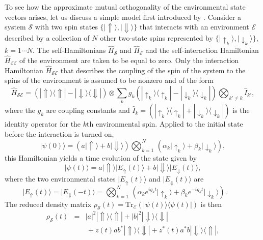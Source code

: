 \documentclass[rmp,aps,amsmath,amsfonts,noshowkeys,noshowpacs,12pt]{revtex4}
\newcommand{\ket}[1]{\ensuremath{|{#1\rangle}}}
\newcommand{\bra}[1]{\ensuremath{{\langle #1}|}}
\newcommand{\ketbra}[2]{\ensuremath{|{#1 \rangle}{\langle #2}|}}
\begin{document}
To see how the approximate mutual orthogonality of the environmental
state vectors arises, let us discuss a simple model first introduced
by \citet{Zurek:1982:tv}.  Consider a system $\mathcal{S}$ with two
spin states $\{ \ket{\Uparrow}, \ket{\Downarrow} \}$ that interacts
with an environment $\mathcal{E}$ described by a collection of $N$
other two-state spins represented by $\{ \ket{\uparrow_k},
\ket{\downarrow_k} \}$, $k=1\cdots N$. The self-Hamiltonians
$\widehat{H}_{\mathcal{S}}$ and $\widehat{H}_{\mathcal{E}}$ and the
self-interaction Hamiltonian $\widehat{H}_\mathcal{EE}$ of the
environment are taken to be equal to zero.  Only the interaction
Hamiltonian $\widehat{H}_\mathcal{SE}$ that describes the coupling of
the spin of the system to the spins of the environment is assumed to
be nonzero and of the form
%
\begin{equation} 
\widehat{H}_\mathcal{SE} = ( \ketbra{\Uparrow}{\Uparrow} -
\ketbra{\Downarrow}{\Downarrow} ) \otimes \sum_k g_k (
\ketbra{\uparrow_k}{\uparrow_k} - \ketbra{\downarrow_k}{\downarrow_k} )
\bigotimes_{k' \not= k}  \widehat{I}_{k'}, 
\end{equation}
%
where the $g_k$ are coupling constants and $\widehat{I}_{k} =
(\ketbra{\uparrow_k}{\uparrow_k} +
\ketbra{\downarrow_k}{\downarrow_k})$ is the identity operator for the
$k$th environmental spin. Applied to the initial state before the
interaction is turned on,
%
\begin{equation}
\ket{\psi(0)} = ( a\ket{\Uparrow} + b\ket{\Downarrow} ) \bigotimes_{k=1}^N
\, ( \alpha_k \ket{\uparrow_k} + \beta_k \ket{\downarrow_k} ),
\end{equation}
%
this Hamiltonian yields a time evolution of the state given by
%
\begin{equation} 
\ket{\psi(t)} = a\ket{\Uparrow}\ket{E_{\Uparrow}(t)} +
b\ket{\Downarrow}\ket{E_{\Downarrow}(t)},
\end{equation}
%
where the two environmental states $\ket{E_{\Uparrow}(t)}$ and
$\ket{E_{\Downarrow}(t)}$ are
%
\begin{equation} 
\ket{E_{\Uparrow}(t)} = \ket{E_{\Downarrow}(-t)} 
= \bigotimes_{k=1}^N\,
 ( \alpha_k e^{ig_kt}\ket{\uparrow_k} + \beta_k
e^{-ig_kt}\ket{\downarrow_k} ). \phantom{xxxx} 
\end{equation}
%
The reduced density matrix $\rho_{\mathcal{S}}(t)=\text{Tr}_{\mathcal{E}} (\ket{\psi(t)}
\bra{\psi(t)})$ is then
%
\begin{eqnarray}
\rho_{\mathcal{S}}(t) &=& |a|^2
\ketbra{\Uparrow}{\Uparrow} + |b|^2 \ketbra{\Downarrow}{\Downarrow}
\nonumber \\ && \, + z(t)ab^*\ketbra{\Uparrow}{\Downarrow} +
z^*(t)a^*b\ketbra{\Downarrow}{\Uparrow},
\end{eqnarray}
\end{document}
